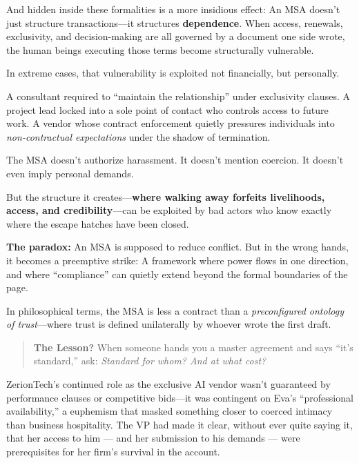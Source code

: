 \begin{tcolorbox}[colback=blue!5!white, colframe=blue!50!black, breakable,
  title={Philosophical Sidebar: The Master Service Agreement as a Weapon of Control}]
And hidden inside these formalities is a more insidious effect:  An MSA doesn’t just structure transactions—it structures \textbf{dependence}.  When access, renewals, exclusivity, and decision-making are all governed by a document one side wrote, the human beings executing those terms become structurally vulnerable.

\medskip

In extreme cases, that vulnerability is exploited not financially, but personally.

\medskip

A consultant required to “maintain the relationship” under exclusivity clauses.  A project lead locked into a sole point of contact who controls access to future work.  A vendor whose contract enforcement quietly pressures individuals into \textit{non-contractual expectations} under the shadow of termination.

\medskip

The MSA doesn’t authorize harassment.  It doesn’t mention coercion.  It doesn’t even imply personal demands.

\medskip

But the structure it creates—\textbf{where walking away forfeits livelihoods, access, and credibility}—can be exploited by bad actors who know exactly where the escape hatches have been closed.

\medskip

\textbf{The paradox:}  An MSA is supposed to reduce conflict.  But in the wrong hands, it becomes a preemptive strike:  A framework where power flows in one direction, and where “compliance” can quietly extend beyond the formal boundaries of the page.

\medskip

In philosophical terms, the MSA is less a contract than a \textit{preconfigured ontology of trust}—where trust is defined unilaterally by whoever wrote the first draft.

\medskip

\begin{quote}
\textbf{The Lesson?} When someone hands you a master agreement and says “it’s standard,” ask: \textit{Standard for whom? And at what cost?}
\end{quote}

\end{tcolorbox}

ZerionTech’s continued role as the exclusive AI vendor wasn’t guaranteed by performance clauses or competitive bids—it was contingent on Eva’s “professional availability,” a euphemism that masked something closer to coerced intimacy than business hospitality. The VP had made it clear, without ever quite saying it, that her access to him --- and her submission to his demands --- were prerequisites for her firm’s survival in the account.

